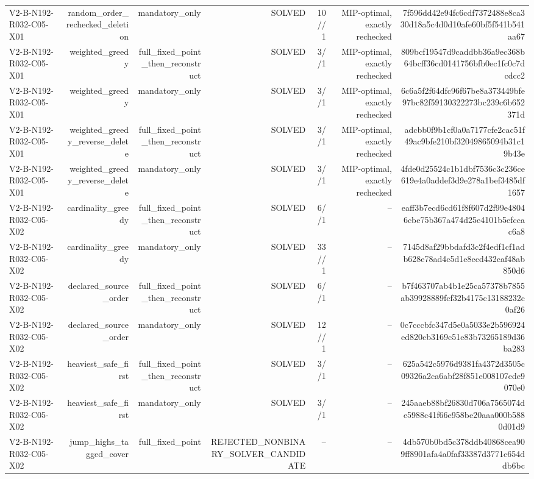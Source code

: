 {\begin{longtable}{lrrrrrr}
V2-B-N192-R032-C05-X01 & random\_order\_rechecked\_deletion & mandatory\_only & SOLVED & 10//1 & MIP-optimal, exactly rechecked & 7f596dd42e94fc6cdf7372488e8ca330d18a5c4d0d10afe60bf5f541b541aa67 \\
V2-B-N192-R032-C05-X01 & weighted\_greedy & full\_fixed\_point\_then\_reconstruct & SOLVED & 3//1 & MIP-optimal, exactly rechecked & 809bcf19547d9caddbb36a9ec368b64bcff36cd0141756bfb0ec1fc0c7dcdcc2 \\
V2-B-N192-R032-C05-X01 & weighted\_greedy & mandatory\_only & SOLVED & 3//1 & MIP-optimal, exactly rechecked & 6c6a5f2f64dfc96f67be8a373449bfe97bc82f59130322273bc239c6b652371d \\
V2-B-N192-R032-C05-X01 & weighted\_greedy\_reverse\_delete & full\_fixed\_point\_then\_reconstruct & SOLVED & 3//1 & MIP-optimal, exactly rechecked & adcbb0f9b1cf0a0a7177cfe2cac51f49ac9bfe210bf32049865094b31c19b43e \\
V2-B-N192-R032-C05-X01 & weighted\_greedy\_reverse\_delete & mandatory\_only & SOLVED & 3//1 & MIP-optimal, exactly rechecked & 4fde0d25524c1b1dbf7536c3c236ce619e4a0addef3d9e278a1bef3485df1657 \\
V2-B-N192-R032-C05-X02 & cardinality\_greedy & full\_fixed\_point\_then\_reconstruct & SOLVED & 6//1 & -- & eaff3b7ecd6cd61f8f607d2f99e48046cbe75b367a474d25e4101b5efccac6a8 \\
V2-B-N192-R032-C05-X02 & cardinality\_greedy & mandatory\_only & SOLVED & 33//1 & -- & 7145d8af29bbdafd3c2f4edf1cf1adb628e78ad4c5d1e8ecd432caf48ab850d6 \\
V2-B-N192-R032-C05-X02 & declared\_source\_order & full\_fixed\_point\_then\_reconstruct & SOLVED & 6//1 & -- & b7f463707ab4b1e25ca57378b7855ab39928889fcf32b4175c13188232c0af26 \\
V2-B-N192-R032-C05-X02 & declared\_source\_order & mandatory\_only & SOLVED & 12//1 & -- & 0c7cccbfc347d5e0a5033e2b596924ed820cb3169c51e83b73265189d36ba283 \\
V2-B-N192-R032-C05-X02 & heaviest\_safe\_first & full\_fixed\_point\_then\_reconstruct & SOLVED & 3//1 & -- & 625a542c5976d9381fa4372d3505c09326a2ca6abf28f851e008107ede9070e0 \\
V2-B-N192-R032-C05-X02 & heaviest\_safe\_first & mandatory\_only & SOLVED & 3//1 & -- & 245aaeb88bf26830d706a7565074de5988c41f66e958be20aaa000b5880d01d9 \\
V2-B-N192-R032-C05-X02 & jump\_highs\_tagged\_cover & full\_fixed\_point & REJECTED\_NONBINARY\_SOLVER\_CANDIDATE & -- & -- & 4db570b0bd5c378ddb40868cea909ff8901afa4a0faf33387d3771c654ddb6bc \\

\end{longtable}}

